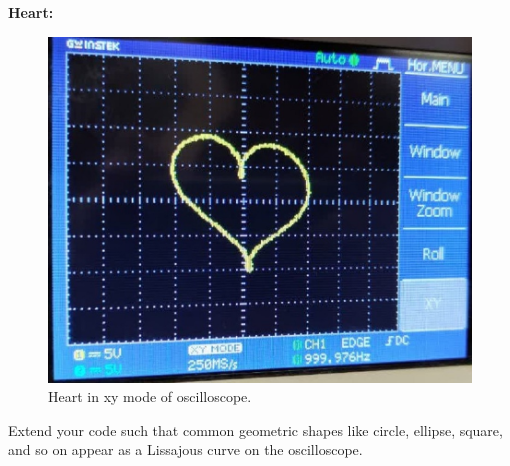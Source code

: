 \documentclass[11pt]{article}
\begin{document}
\begin{question}
\begin{subquestion}
{	\textbf{Heart:}
	
	\begin{figure}[H]
		\centering
		\includegraphics[scale=0.4,angle=0]{Fig/Heart.jpg}
		\caption{Heart in xy mode of oscilloscope.} \label{fig:cir2}
	\end{figure}
}
\end{subquestion}
\begin{subquestion}{Extend your code such that common geometric shapes like circle, ellipse, square, and so on appear as a Lissajous curve on the oscilloscope.} 
\end{subquestion}
\end{question}
\end{document}
